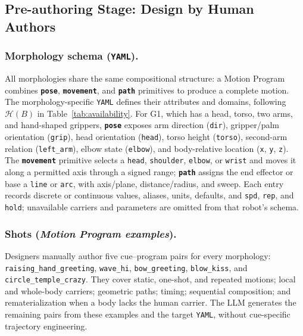 \documentclass[letterpaper,10pt,conference]{ieeeconf}
\newcommand{\posecolor}[1]{\texttt{\textbf{\textcolor{PoseColor}{#1}}}}
\newcommand{\movecolor}[1]{\texttt{\textbf{\textcolor{MoveColor}{#1}}}}
\newcommand{\pathcolor}[1]{\texttt{\textbf{\textcolor{PathColor}{#1}}}}
\begin{document}
\subsection{Pre-authoring Stage: Design by Human Authors}
\setlength{\itemsep}{0.15em}
\subsubsection{Morphology schema (\texttt{YAML}).}
All morphologies share the same compositional structure: a Motion Program combines \posecolor{pose}, \movecolor{movement}, and \pathcolor{path} primitives to produce a complete motion.
The morphology-specific \texttt{YAML} defines their attributes and domains, following $\mathcal{H}(B)$ in Table~\ref{tab:availability}.
For G1, which has a head, torso, two arms, and hand-shaped grippers, \posecolor{pose} exposes arm direction (\texttt{dir}), gripper/palm orientation (\texttt{grip}), head orientation (\texttt{head}), torso height (\texttt{torso}), second-arm relation (\texttt{left\_arm}), elbow state (\texttt{elbow}), and body-relative location (\texttt{x}, \texttt{y}, \texttt{z}).
The \movecolor{movement} primitive selects a \texttt{head}, \texttt{shoulder}, \texttt{elbow}, or \texttt{wrist} and moves it along a permitted axis through a signed range; \pathcolor{path} assigns the end effector or base a \texttt{line} or \texttt{arc}, with axis/plane, distance/radius, and sweep.
Each entry records discrete or continuous values, aliases, units, defaults, and \texttt{spd}, \texttt{rep}, and \texttt{hold}; unavailable carriers and parameters are omitted from that robot's schema.

\subsubsection{Shots (\textit{Motion Program examples}).}
Designers manually author five cue--program pairs for every morphology: \texttt{raising\_hand\_greeting}, \texttt{wave\_hi}, \texttt{bow\_greeting}, \texttt{blow\_kiss}, and \texttt{circle\_temple\_crazy}.
They cover static, one-shot, and repeated motions; local and whole-body carriers; geometric paths; timing; sequential composition; and rematerialization when a body lacks the human carrier.
The LLM generates the remaining pairs from these examples and the target \texttt{YAML}, without cue-specific trajectory engineering.
\end{document}
